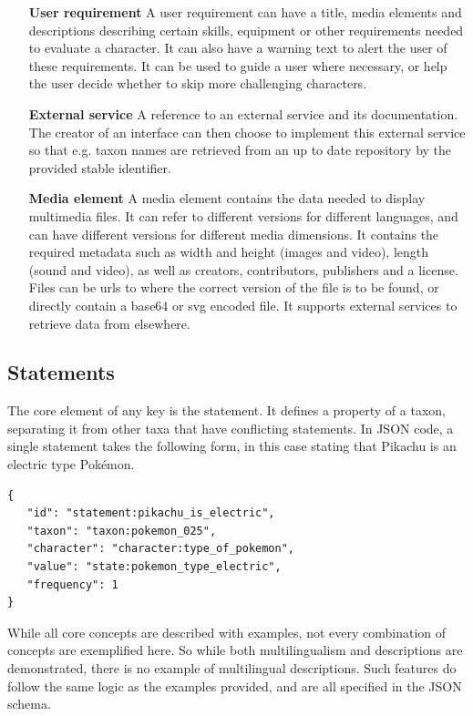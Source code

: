\documentclass[10pt,letterpaper]{article}
\begin{document}
\begin{itemize}
\item[\textbf{User requirement}]
A user requirement can have a title, media elements and descriptions describing certain skills, equipment or other requirements needed to evaluate a character. It can also have a warning text to alert the user of these requirements. It can be used to guide a user where necessary, or help the user decide whether to skip more challenging characters.
\item[\textbf{External service}]
A reference to an external service and its documentation. The creator of an interface can then choose to implement this external service so that e.g. taxon names are retrieved from an up to date repository by the provided stable identifier.
\item[\textbf{Media element}]
A media element contains the data needed to display multimedia files. It can refer to different versions for different languages, and can have different versions for different media dimensions. It contains the required metadata such as width and height (images and video), length (sound and video), as well as creators, contributors, publishers and a license. Files can be urls to where the correct version of the file is to be found, or directly contain a base64 or svg encoded file. It supports external services to retrieve data from elsewhere.


\end{itemize}

\subsection*{
Statements
}

The core element of any key is the statement. It defines a property of a taxon, separating it from other taxa that have conflicting statements. In JSON code, a single statement takes the following form, in this case stating that Pikachu is an electric type Pokémon.

\begin{verbatim}
{
   "id": "statement:pikachu_is_electric",
   "taxon": "taxon:pokemon_025",
   "character": "character:type_of_pokemon",
   "value": "state:pokemon_type_electric",
   "frequency": 1
}

\end{verbatim}

While all core concepts are described with examples, not every combination of concepts are exemplified here. So while both multilingualism and descriptions are demonstrated, there is no example of multilingual descriptions. Such features do follow the same logic as the examples provided, and are all specified in the JSON schema.
\end{document}
